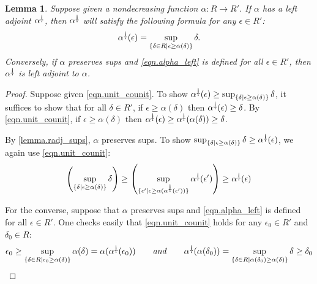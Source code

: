 \documentclass[11pt, one side, article]{memoir}
\theoremstyle{definition}
\theoremstyle{plain}
\newtheorem{lemma}[definitionx]{Lemma}
\newenvironment{example}
  {\pushQED{\qed}\renewcommand{\qedsymbol}{$\lozenge$}\examplex}
  {\popQED\endexamplex}
\DeclarePairedDelimiter{\floor}{\lfloor}{\rfloor}
\DeclarePairedDelimiter{\ceil}{\lceil}{\rceil}
\newcommand{\ldag}{^{\rotatebox{180}{$\dagger$}}}
\newcommand{\tn}[1]{\textnormal{#1}}
\newcommand{\blank}[1][1pt]{\hspace{#1}\cdot\hspace{#1}}
\newcommand{\hh}[2][]{#1 \tn{\textit{#2}} #1}
\newcommand{\qqand}{\hh[\qquad]{and}}
\newcommand{\flr}[2][\blank]{\floor{#1}_{#2}}
\newcommand{\clg}[2][\blank]{\ceil{#1}_{#2}}
\begin{document}
\begin{lemma}\label{lemma.sup_formula}
Suppose given a nondecreasing function $\alpha\colon R\to R'$. If $\alpha$ has a left adjoint $\alpha\ldag$, then $\alpha\ldag$ will satisfy the following formula for any $\epsilon\in R'$:
\begin{equation}\label{eqn.alpha_left}
  \alpha\ldag(\epsilon)=\sup_{\{\delta\in R\mid \epsilon\geq\alpha(\delta)\}}\delta.
\end{equation}
Conversely, if $\alpha$ preserves sups and \eqref{eqn.alpha_left} is defined for all $\epsilon\in R'$, then $\alpha\ldag$ is left adjoint to $\alpha$.
\end{lemma}
\begin{proof}
Suppose given \eqref{eqn.unit_counit}. To show $\alpha\ldag(\epsilon)\geq\sup_{\{\delta\mid \epsilon\geq\alpha(\delta)\}}\delta$, it suffices to show that for all $\delta\in R'$, if $\epsilon\geq\alpha(\delta)$ then $\alpha\ldag(\epsilon)\geq\delta$. By \eqref{eqn.unit_counit}, if $\epsilon\geq\alpha(\delta)$ then $\alpha\ldag(\epsilon)\geq\alpha\ldag(\alpha(\delta))\geq\delta$. 

By \cref{lemma.radj_sups}, $\alpha$ preserves sups. To show 
$
\sup_{\{\delta\mid \epsilon\geq\alpha(\delta)\}}\delta
\geq
\alpha\ldag(\epsilon)
$, we again use \eqref{eqn.unit_counit}:
\[
\left(\sup_{\{\delta\mid \epsilon\geq\alpha(\delta)\}}\delta \right)\geq
\left(\sup_{\{\epsilon'\mid \epsilon\geq\alpha(\alpha\ldag(\epsilon'))\}}\alpha\ldag(\epsilon')\right)\geq\alpha\ldag(\epsilon)
\]

For the converse, suppose that $\alpha$ preserves sups and \eqref{eqn.alpha_left} is defined for all $\epsilon\in R'$. One checks easily that \eqref{eqn.unit_counit} holds for any $\epsilon_0\in R'$ and $\delta_0\in R$:
\[
	\epsilon_0
	\geq
  \sup_{\{\delta\in R\mid \epsilon_0\geq\alpha(\delta)\}}\alpha(\delta)
  =\alpha(\alpha\ldag(\epsilon_0))
  \qqand
  \alpha\ldag(\alpha(\delta_0))=
  \sup_{\{\delta\in R\mid \alpha(\delta_0)\geq\alpha(\delta)\}}\delta
  \geq\delta_0
\]

\end{proof}

\end{document}
